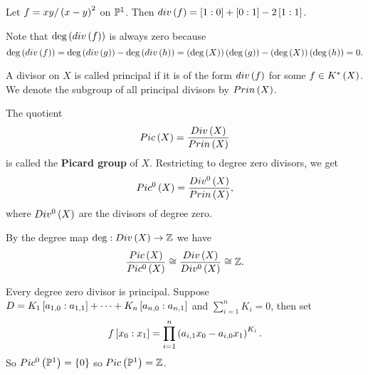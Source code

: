 \begin{example}
Let $ f = xy / \rb{x - y}^2 $ on $ \P^1 $. Then $ div\rb{f} = \sb{1 : 0} + \sb{0 : 1} - 2\sb{1 : 1} $.
\end{example}

\begin{remark}
Note that $ \deg\rb{div\rb{f}} $ is always zero because
$$ \deg\rb{div\rb{f}} = \deg\rb{div\rb{g}} - \deg\rb{div\rb{h}} = \rb{\deg\rb{X}}\rb{\deg\rb{g}} - \rb{\deg\rb{X}}\rb{\deg\rb{h}} = 0. $$
\end{remark}

\begin{definition}
A divisor on $ X $ is called principal if it is of the form $ div\rb{f} $ for some $ f \in K^*\rb{X} $. We denote the subgroup of all principal divisors by $ Prin\rb{X} $.
\end{definition}

\begin{definition}
The quotient
$$ Pic\rb{X} = \dfrac{Div\rb{X}}{Prin\rb{X}} $$
is called the \textbf{Picard group} of $ X $. Restricting to degree zero divisors, we get
$$ Pic^0\rb{X} = \dfrac{Div^0\rb{X}}{Prin\rb{X}}, $$
where $ Div^0\rb{X} $ are the divisors of degree zero.
\end{definition}

By the degree map $ \deg : Div\rb{X} \to \Z $ we have
$$ \dfrac{Pic\rb{X}}{Pic^0\rb{X}} \cong \dfrac{Div\rb{X}}{Div^0\rb{X}} \cong \Z. $$

\begin{example}
Every degree zero divisor is principal. Suppose $ D = K_1\sb{a_{1, 0} : a_{1, 1}} + \dots + K_n\sb{a_{n, 0} : a_{n, 1}} $ and $ \sum_{i = 1}^n K_i = 0 $, then set
$$ f\sb{x_0 : x_1} = \prod_{i = 1}^n \rb{a_{i, 1}x_0 - a_{i, 0}x_1}^{K_i}. $$
So $ Pic^0\rb{\P^1} = \cb{0} $ so $ Pic\rb{\P^1} = \Z $.
\end{example}

